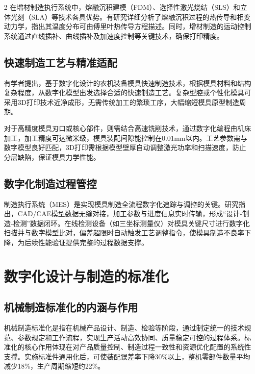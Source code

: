 \documentclass[fontset=windows,12pt,UTF8]{ctexart}
\begin{document}
\begin{multicols}{2}
	在增材制造执行系统中，熔融沉积建模（FDM）、选择性激光烧结（SLS）和立体光刻（SLA）等技术各具优势。有研究详细分析了熔融沉积过程的热传导和相变动力学，指出其温度分布可由傅里叶热传导方程描述。同时，增材制造的运动控制系统通过直线插补、曲线插补及加速度控制等关键技术，确保打印精度\cite{_3d_2025}。

	\subsection{快速制造工艺与精准适配}

	有学者提出，基于数字化设计的农机装备模具快速制造技术，根据模具材料和结构复杂程度，从数字化模型出发选择合适的快速制造工艺。复杂型腔或个性化模具可采用3D打印技术近净成形，无需传统加工的繁琐工序，大幅缩短模具原型制造周期\cite{__2025-3}。

	对于高精度模具刃口或核心部件，则需结合高速铣削技术，通过数字化编程由机床加工，加工精度可达微米级，模具装配间隙能控制在0.01mm以内。工艺参数需与数字模型良好匹配，3D打印需根据模型壁厚自动调整激光功率和扫描速度，防止分层缺陷，保证模具力学性能。

	\subsection{数字化制造过程管控}

	制造执行系统（MES）是实现模具制造全流程数字化追踪与调控的关键。研究指出，CAD/CAE模型数据无缝对接，加工参数与进度信息实时传输，形成“设计-制造-检测”数据闭环\cite{__2025-3}。在线检测设备（如三坐标测量仪）对模具关键尺寸进行数字化扫描并与数字模型比对，偏差超限时自动触发工艺调整指令，使模具制造不良率下降，为后续性能验证提供完整的过程数据支撑。

	\section{数字化设计与制造的标准化}

	\subsection{机械制造标准化的内涵与作用}

	机械制造标准化是指在机械产品设计、制造、检验等阶段，通过制定统一的技术规范、参数规定和工作流程，实现生产活动高效协同、质量稳定可控的过程体系。标准化的核心作用体现在对产品质量控制、制造过程一致性和资源优化配置的系统性支撑。实施标准件通用化后，可使装配误差率下降30\%以上，整机零部件数量平均减少18\%，生产周期缩短约22\%\cite{__2025-5}。


\end{multicols}
\end{document}
